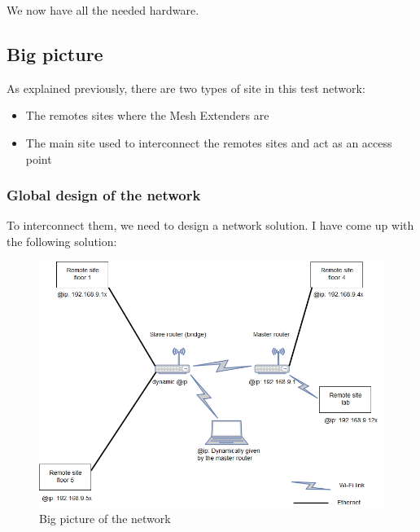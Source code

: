 We now have all the needed hardware.





\subsection{Big picture}

As explained previously, there are two types of site in this test network:
\begin{itemize}
	\item The remotes sites where the Mesh Extenders are
	\item The main site used to interconnect the remotes sites and act as an access point
\end{itemize}











\subsubsection{Global design of the network}

To interconnect them, we need to design a network solution.
I have come up with the following solution:
\begin{figure}[H]
\begin{center}
\includegraphics[width=\textwidth]{image/networkBigpicture.png}%
\caption{Big picture of the network}%
\label{figure:NetworkBigPicture}%
\end{center}
\end{figure}

